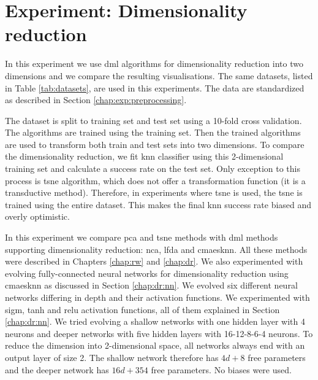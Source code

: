 \documentclass[12pt,a4paper]{report}
\begin{document}


\section{Experiment: Dimensionality reduction} \label{chap:exp:dimred}


In this experiment we use \acl{dml} algorithms for dimensionality reduction into two dimensions and we compare the resulting visualisations. The same datasets, listed in Table \ref{tab:datasets}, are used in this experiments. The data are standardized as described in Section \ref{chap:exp:preprocessing}.

The dataset is split to training set and test set using a 10-fold cross validation. The algorithms are trained using the training set. Then the trained algorithms are used to transform both train and test sets into two dimensions. To compare the dimensionality reduction, we fit \ac{knn} classifier using this 2-dimensional training set and calculate a success rate on the test set. Only exception to this process is \ac{tsne} algorithm, which does not offer a transformation function (it is a transductive method). Therefore, in experiments where \ac{tsne} is used, the \ac{tsne} is trained using the entire dataset. This makes the final \ac{knn} success rate biased and overly optimistic. %

In this experiment we compare \ac{pca} and \ac{tsne} methods with \acl{dml} methods supporting dimensionality reduction: \ac{nca}, \ac{lfda} and \ac{cmaesknn}. All these methods were described in Chapters \ref{chap:rw} and \ref{chap:dr}. We also experimented with evolving fully-connected neural networks for dimensionality reduction using \acl{cmaesknn} as discussed in Section \ref{chap:dr:nn}. We evolved six different neural networks differing in depth and their activation functions. We experimented with \ac{sigm}, \ac{tanh} and \ac{relu} activation functions, all of them explained in Section \ref{chap:dr:nn}. We tried evolving a shallow networks with one hidden layer with 4 neurons and deeper networks with five hidden layers with 16-12-8-6-4 neurons. To reduce the dimension into 2-dimensional space, all networks always end with an output layer of size 2. The shallow network therefore has $4d+8$ free parameters and the deeper network has $16d+354$ free parameters. No biases were used.
\end{document}
